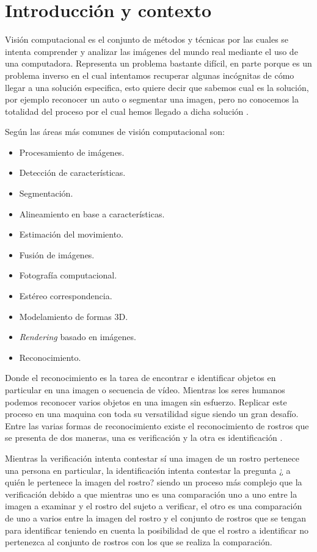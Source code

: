 \chapter{Introducción y contexto}\label{chap:Intro}

Visión computacional es el conjunto de métodos y técnicas por las cuales se intenta comprender y analizar las imágenes del mundo real mediante el uso de una computadora.
Representa un problema bastante difícil, en parte porque es un problema inverso en el cual intentamos recuperar algunas incógnitas de cómo llegar a una solución especifica, esto quiere decir que sabemos cual es la solución, por ejemplo reconocer un auto o segmentar una imagen, pero no conocemos la totalidad del proceso por el cual hemos llegado a dicha solución \citep{szeliski2010computer}. 

Según \citep{szeliski2010computer} las áreas más comunes de visión computacional son: 
\begin{itemize}
\item Procesamiento de imágenes.
\item Detección de características.
\item Segmentación.
\item Alineamiento en base a características.
\item Estimación del movimiento.
\item Fusión de imágenes.
\item Fotografía computacional.
\item Estéreo correspondencia.
\item Modelamiento de formas 3D.
\item \textit{Rendering} basado en imágenes.
\item Reconocimiento.
\end{itemize}

Donde el reconocimiento es la tarea de encontrar e identificar objetos en particular en una imagen o secuencia de vídeo. Mientras los seres humanos podemos reconocer varios objetos en una imagen sin esfuerzo. Replicar este proceso en una maquina con toda su versatilidad sigue siendo un gran desafío.
Entre las varias formas de reconocimiento existe el reconocimiento de rostros que se presenta de dos maneras, una es verificación y la otra es identificación \citep{alice2003biometric}.

Mientras la verificación intenta contestar sí una imagen de un rostro pertenece una persona en particular, la identificación intenta contestar la pregunta ¿ a quién le pertenece la imagen del rostro? siendo un proceso más complejo que la verificación debido a que mientras uno es una comparación uno a uno entre la imagen a examinar y el rostro del sujeto a verificar, el otro es una comparación de uno a varios entre la imagen del rostro y el conjunto de rostros que se tengan para identificar teniendo en cuenta la posibilidad de que el rostro a identificar no pertenezca al conjunto de rostros con los que se realiza la comparación.

